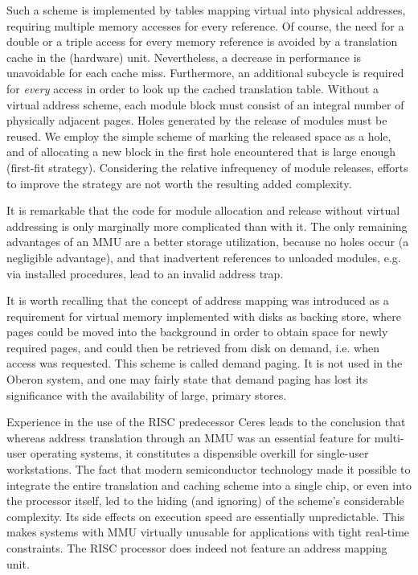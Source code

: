Such a scheme is implemented by tables mapping virtual into physical addresses, requiring multiple memory accesses for every reference. Of course, the need for a double or a triple access for every memory reference is avoided by a translation cache in the (hardware) unit. Nevertheless, a decrease in performance is unavoidable for each cache miss. Furthermore, an additional subcycle is required for \emph{every} access in order to look up the cached translation table. Without a virtual address scheme, each module block must consist of an integral number of physically adjacent pages. Holes generated by the release of modules must be reused. We employ the simple scheme of marking the released space as a hole, and of allocating a new block in the first hole encountered that is large enough (first-fit strategy). Considering the relative infrequency of module releases, efforts to improve the strategy are not worth the resulting added complexity.

It is remarkable that the code for module allocation and release without virtual addressing is only marginally more complicated than with it. The only remaining advantages of an MMU are a better storage utilization, because no holes occur (a negligible advantage), and that inadvertent references to unloaded modules, e.g. via installed procedures, lead to an invalid address trap.

It is worth recalling that the concept of address mapping was introduced as a requirement for virtual memory implemented with disks as backing store, where pages could be moved into the background in order to obtain space for newly required pages, and could then be retrieved from disk on demand, i.e. when access was requested. This scheme is called demand paging. It is not used in the Oberon system, and one may fairly state that demand paging has lost its significance with the availability of large, primary stores.

Experience in the use of the RISC predecessor Ceres leads to the conclusion that whereas address translation through an MMU was an essential feature for multi-user operating systems, it constitutes a dispensible overkill for single-user workstations. The fact that modern semiconductor technology made it possible to integrate the entire translation and caching scheme into a single chip, or even into the processor itself, led to the hiding (and ignoring) of the scheme's considerable complexity. Its side effects on execution speed are essentially unpredictable. This makes systems with MMU virtually unusable for applications with tight real-time constraints. The RISC processor does indeed not feature an address mapping unit.

